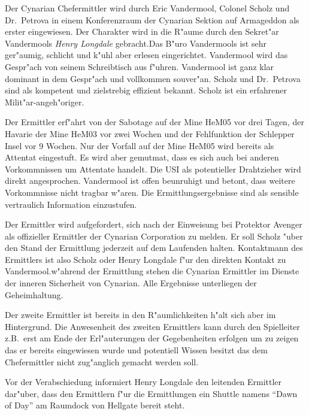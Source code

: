 
Der Cynarian Chefermittler wird durch Eric Vandermool, Colonel Scholz und Dr.~Petrova in einem Konferenzraum der Cynarian Sektion auf Armageddon als erster eingewiesen. Der Charakter wird in die R"aume durch den Sekret"ar Vandermools \emph{Henry Longdale} gebracht.Das B"uro Vandermools ist sehr ger"aumig, schlicht und k"uhl aber erlesen eingerichtet. Vandermool wird das Gespr"ach von seinem Schreibtisch aus f"uhren. Vandermool ist ganz klar dominant in dem Gespr"ach und vollkommen souver"an. Scholz und Dr.~Petrova sind als kompetent und zielstrebig effizient bekannt. Scholz ist ein erfahrener Milit"ar-angeh"origer.

Der Ermittler erf"ahrt von der Sabotage auf der Mine HeM05 vor drei Tagen, der Havarie der Mine HeM03 vor zwei Wochen und der Fehlfunktion der Schlepper Insel vor 9 Wochen. Nur der Vorfall auf der Mine HeM05 wird bereits als Attentat eingestuft. Es wird aber gemutma\3t, dass es sich auch bei anderen Vorkommnissen um Attentate handelt. Die USI als potentieller Drahtzieher wird direkt angesprochen. Vandermool ist offen beunruhigt und betont, dass weitere Vorkommnisse nicht tragbar w"aren. Die Ermittlungsergebnisse sind als sensible vertraulich Information einzustufen. 

Der Ermittler wird aufgefordert, sich nach der Einweisung bei Protektor Avenger als offizieller Ermittler der Cynarian Corporation zu melden. Er soll Scholz "uber den Stand der Ermittlung jederzeit auf dem Laufenden halten. Kontaktmann des Ermittlers ist also Scholz oder Henry Longdale f"ur den direkten Kontakt zu Vandermool.w"ahrend der Ermittlung stehen die Cynarian Ermittler im Dienste der inneren Sicherheit von Cynarian. Alle Ergebnisse unterliegen der Geheimhaltung.

Der zweite Ermittler ist bereits in den R"aumlichkeiten h"alt sich aber im Hintergrund. Die Anwesenheit des zweiten Ermittlers kann durch den Spielleiter z.B.~erst am Ende der Erl"auterungen der Gegebenheiten erfolgen um zu zeigen das er bereits eingewiesen wurde und potentiell Wissen besitzt das dem Chefermittler nicht zug"anglich gemacht werden soll.

Vor der Verabschiedung informiert Henry Longdale den leitenden Ermittler dar"uber, dass den Ermittlern f"ur die Ermittlungen ein Shuttle namens "`Dawn of Day"' am Raumdock von Hellgate bereit steht.


